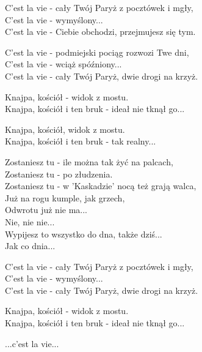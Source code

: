\begin{text}
    C'est la vie - cały Twój Paryż z pocztówek i mgły,\\
    C'est la vie - wymyślony...\\
    C'est la vie - Ciebie obchodzi, przejmujesz się tym.

    C'est la vie - podmiejski pociąg rozwozi Twe dni,\\
    C'est la vie - wciąż spóźniony...\\
    C'est la vie - cały Twój Paryż, dwie drogi na krzyż.

    Knajpa, kościół - widok z mostu.\\
    Knajpa, kościół i ten bruk - ideał nie tknął go...

    Knajpa, kościół, widok z mostu.\\
    Knajpa, kościół i ten bruk - tak realny...

    Zostaniesz tu - ile można tak żyć na palcach,\\
    Zostaniesz tu - po złudzenia.\\
    Zostaniesz tu - w 'Kaskadzie' nocą też grają walca,\\
    Już na rogu kumple, jak grzech,\\
    Odwrotu już nie ma...\\
    Nie, nie nie...\\
    Wypijesz to wszystko do dna, także dziś...\\
    Jak co dnia...

    C'est la vie - cały Twój Paryż z pocztówek i mgły,\\
    C'est la vie - wymyślony...\\
    C'est la vie - cały Twój Paryż, dwie drogi na krzyż.

    Knajpa, kościół - widok z mostu.\\
    Knajpa, kościół i ten bruk - ideał nie tknął go...

    ...c'est la vie...
\end{text}
\begin{chord}

\end{chord}